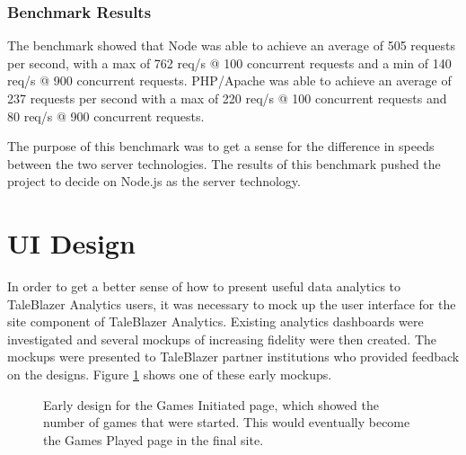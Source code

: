 \subsubsection{Benchmark Results}	

The benchmark showed that Node was able to achieve an average of 505 requests per second, with a max of 762 req/s @ 100 concurrent requests and a min of 140 req/s @ 900 concurrent requests. PHP/Apache was able to achieve an average of 237 requests per second with a max of 220 req/s @ 100 concurrent requests and 80 req/s @ 900 concurrent requests. 

The purpose of this benchmark was to get a sense for the difference in speeds between the two server technologies. The results of this benchmark pushed the project to decide on Node.js as the server technology.

\section{UI Design}

In order to get a better sense of how to present useful data analytics to TaleBlazer Analytics users, it was necessary to mock up the user interface for the site component of TaleBlazer Analytics. Existing analytics dashboards were investigated and several mockups of increasing fidelity were then created. The mockups were presented to TaleBlazer partner institutions who provided feedback on the designs. Figure \ref{fig:mockup_initiated} shows one of these early mockups.

\begin{figure}[H]
	\caption[Early Analytics Site Mockup]{\label{fig:mockup_initiated} Early design for the Games Initiated page, which showed the number of games that were started. This would eventually become the Games Played page in the final site.}
\end{figure}

